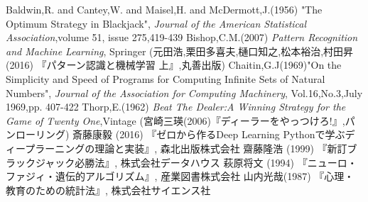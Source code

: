 \begin{thebibliography}{9}
   Baldwin,R. and Cantey,W. and Maisel,H. and McDermott,J.(1956) "The Optimum Strategy in Blackjack", {\it{Journal of the American Statistical Association}},volume 51, issue 275,419-439
   Bishop,C.M.(2007) {\it{Pattern Recognition and Machine Learning}}, Springer (元田浩,栗田多喜夫,樋口知之,松本裕治,村田昇 (2016) 『パターン認識と機械学習 上』,丸善出版)
   Chaitin,G.J(1969)"On the Simplicity and Speed of Programs for Computing Infinite Sets of Natural Numbers", {\it{Journal of the Association for Computing Machinery}}, Vol.16,No.3,July 1969,pp. 407-422
   Thorp,E.(1962) {\it{Beat The Dealer:A Winning Strategy for the Game of Twenty One}},Vintage (宮崎三瑛(2006)『ディーラーをやっつけろ!』,パンローリング)
   斎藤康毅 (2016) 『ゼロから作るDeep Learning Pythonで学ぶディープラーニングの理論と実装』, 森北出版株式会社
   齋藤隆浩 (1999) 『新訂ブラックジャック必勝法』, 株式会社データハウス
   萩原将文 (1994) 『ニューロ・ファジィ・遺伝的アルゴリズム』, 産業図書株式会社
   山内光哉(1987) 『心理・教育のための統計法』, 株式会社サイエンス社
\end{thebibliography}
